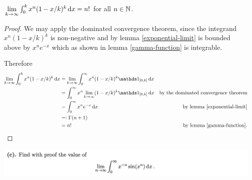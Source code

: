 \begin{claim*}
  $\lim_{k \to \infty} \int_0^k x^n (1 - x/k)^k \dx= n!$ for all $n \in \mathbb{N}$.

\end{claim*}

\begin{proof}
  We may apply the dominated convergence theorem, since the integrand $x^n (1 - x/k)^k$ is
  non-negative and by lemma \ref{exponential-limit} is bounded above by $x^ne^{-x}$ which as shown
  in lemma \ref{gamma-function} is integrable.

  Therefore
  \begin{align*}
    \lim_{k \to \infty} \int_0^k x^n (1 - x/k)^k \dx
    &= \lim_{k \to \infty} \int_0^\infty x^n (1 - x/k)^k\ind_{[0, k]} \dx \\
    &= \int_0^\infty x^n \lim_{k \to \infty} (1 - x/k)^k\ind_{[0, k]} \dx & \text{by the dominated convergence theorem}\\
    &= \int_0^\infty x^n e^{-x} \dx & \text{by lemma \ref{exponential-limit}}\\
    &=: \Gamma(n + 1) \\
    &= n!  & \text{by lemma \ref{gamma-function}}.\\
  \end{align*}
\end{proof}


\newpage
\begin{mdframed}
  \includegraphics[width=400pt]{img/analysis--berkeley-202a-final-c137.png}
\end{mdframed}

